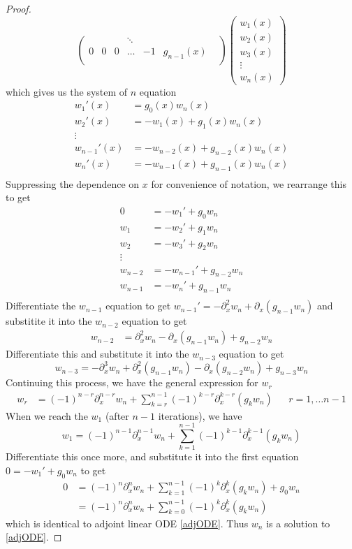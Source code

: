 \documentclass[thesis.tex]{subfiles}
\begin{document}
\begin{lemma}
\begin{proof}
\begin{equation*}
\begin{pmatrix}
& &  & \ddots &  & & \\
0 & 0 & 0 & \dots  & -1 & g_{n-1}(x) \\
\end{pmatrix}
\begin{pmatrix}
w_1(x) \\ w_2(x) \\ w_3(x) \\ \vdots \\ w_n(x)
\end{pmatrix}
\end{equation*}
which gives us the system of $n$ equation 
\begin{align*}
w_1'(x) &= g_0(x) w_n(x) \\
w_2'(x) &= -w_1(x) + g_1(x) w_n(x) \\
\vdots \\
w_{n-1}'(x) &= -w_{n-2}(x) + g_{n-2}(x) w_n(x) \\
w_n'(x) &= -w_{n-1}(x) + g_{n-1}(x) w_n(x) \\
\end{align*}
Suppressing the dependence on $x$ for convenience of notation, we rearrange this to get
\begin{align*}
0 &= -w_1' + g_0 w_n \\
w_1 &= -w_2' + g_1 w_n \\
w_2 &= -w_3' + g_2 w_n \\
\vdots \\
w_{n-2} &= -w_{n-1}' + g_{n-2} w_n \\
w_{n-1} &= -w_n' + g_{n-1} w_n \\
\end{align*}
Differentiate the $w_{n-1}$ equation to get $w_{n-1}' = -\partial_x^2 w_n + \partial_x(g_{n-1}w_n)$ and substitite it into the $w_{n-2}$ equation to get
\begin{align*}
w_{n-2} &= \partial_x^2 w_n - \partial_x(g_{n-1} w_n) + g_{n-2} w_n
\end{align*}
Differentiate this and substitute it into the $w_{n-3}$ equation to get
\[
w_{n-3} = -\partial_x^3 w_n + \partial_x^2(g_{n-1} w_n) - \partial_x(g_{n-2} w_n) + g_{n-3} w_n
\]
Continuing this process, we have the general expression for $w_r$
\begin{align*}
w_r &= (-1)^{n-r} \partial_x^{n-r}w_n + \sum_{k=r}^{n-1} (-1)^{k-r} \partial_x^{k-r}(g_k w_n) && r = 1, \dots n-1
\end{align*}
When we reach the $w_1$ (after $n-1$ iterations), we have
\[
w_1 = (-1)^{n-1} \partial_x^{n-1} w_n + \sum_{k=1}^{n-1} (-1)^{k-1} \partial_x^{k-1}(g_k w_n)
\]
Differentiate this once more, and substitute it into the first equation $0 = -w_1' + g_0 w_n$ to get 
\begin{align*}
0 &= (-1)^{n} \partial_x^{n} w_n + \sum_{k=1}^{n-1} (-1)^{k} \partial_x^{k}(g_k w_n) + g_0 w_n \\
&= (-1)^{n} \partial_x^{n} w_n + \sum_{k=0}^{n-1} (-1)^{k} \partial_x^{k}(g_k w_n)
\end{align*}
which is identical to adjoint linear ODE \eqref{adjODE}. Thus $w_n$ is a solution to \eqref{adjODE}.
\end{proof}
\end{lemma}
\end{document}

